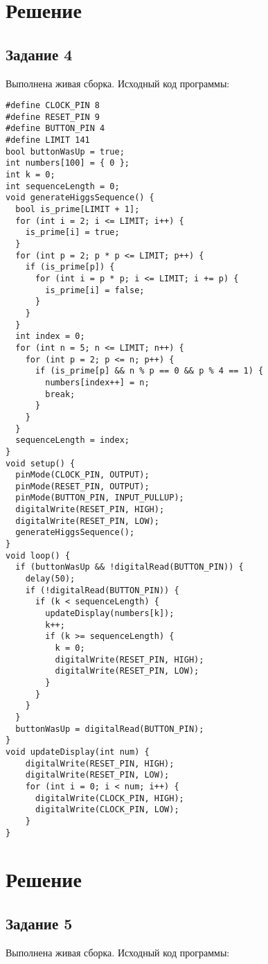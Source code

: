 \documentclass[a4paper,14pt]{extarticle}
\begin{document}
  \section*{\hspace{12.5mm}Решение}
  \subsection*{\hspace{12.5mm}Задание 4}
  Выполнена живая сборка. Исходный код программы:

  \begingroup
    \fontsize{14pt}{10pt}\selectfont
    \linespread{1}
    \begin{verbatim}
#define CLOCK_PIN 8
#define RESET_PIN 9
#define BUTTON_PIN 4
#define LIMIT 141
bool buttonWasUp = true;
int numbers[100] = { 0 };
int k = 0;
int sequenceLength = 0;
void generateHiggsSequence() {
  bool is_prime[LIMIT + 1];
  for (int i = 2; i <= LIMIT; i++) {
    is_prime[i] = true;
  }
  for (int p = 2; p * p <= LIMIT; p++) {
    if (is_prime[p]) {
      for (int i = p * p; i <= LIMIT; i += p) {
        is_prime[i] = false;
      }
    }
  }
  int index = 0;
  for (int n = 5; n <= LIMIT; n++) {
    for (int p = 2; p <= n; p++) {
      if (is_prime[p] && n % p == 0 && p % 4 == 1) {
        numbers[index++] = n;
        break;
      }
    }
  }
  sequenceLength = index;
}
void setup() {
  pinMode(CLOCK_PIN, OUTPUT);
  pinMode(RESET_PIN, OUTPUT);
  pinMode(BUTTON_PIN, INPUT_PULLUP);
  digitalWrite(RESET_PIN, HIGH);
  digitalWrite(RESET_PIN, LOW);
  generateHiggsSequence();
}
void loop() {
  if (buttonWasUp && !digitalRead(BUTTON_PIN)) {
    delay(50);
    if (!digitalRead(BUTTON_PIN)) {
      if (k < sequenceLength) {
        updateDisplay(numbers[k]);
        k++;
        if (k >= sequenceLength) {
          k = 0;
          digitalWrite(RESET_PIN, HIGH);
          digitalWrite(RESET_PIN, LOW);
        }
      }
    }
  }
  buttonWasUp = digitalRead(BUTTON_PIN);
}
void updateDisplay(int num) {
    digitalWrite(RESET_PIN, HIGH);
    digitalWrite(RESET_PIN, LOW);
    for (int i = 0; i < num; i++) {
      digitalWrite(CLOCK_PIN, HIGH);
      digitalWrite(CLOCK_PIN, LOW);
    }
}
    \end{verbatim}
  \endgroup

  \section*{\hspace{12.5mm}Решение}
  \subsection*{\hspace{12.5mm}Задание 5}
  Выполнена живая сборка. Исходный код программы:
\end{document}
